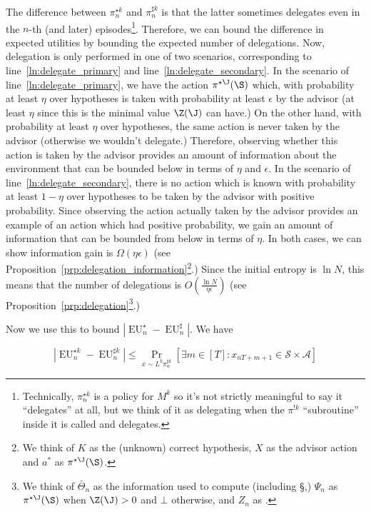 \documentclass[anon,12pt]{colt2018} %
\newcommand{\AP}[1]{\left(#1\right)}
\newcommand{\AB}[1]{\left[#1\right]}
\newcommand{\Pa}[2]{\underset{#1}{\operatorname{Pr}}\AB{#2}}
\newcommand{\Abs}[1]{\left\vert #1 \right\vert}
\newcommand{\A}{\mathcal{A}}
\newcommand{\St}{\mathcal{S}}
\newcommand{\EU}{\operatorname{EU}}
\begin{document}
The difference between $\pi^{\star k}_n$ and $\pi^{\sharp k}_n$ is that the latter sometimes delegates even in the $n$-th (and later) episodes\footnote{Technically, $\pi^{\star k}_n$ is a policy for $M^k$ so it's not strictly meaningful to say it \enquote{delegates} at all, but we think of it as delegating when the $\pi^{!k}$ \enquote{subroutine} inside it is called and delegates.}. Therefore, we can bound the difference in expected utilities by bounding the expected number of delegations. Now, delegation is only performed in one of two scenarios, corresponding to line~\ref{ln:delegate_primary} and line~\ref{ln:delegate_secondary}. In the scenario of line~\ref{ln:delegate_primary}, we have the action $\pi^{\star\J}(\S)$ which, with probability at least $\eta$ over hypotheses is taken with probability at least $\epsilon$ by the advisor (at least $\eta$ since this is the minimal value $\Z(\J)$ can have.) On the other hand, with probability at least $\eta$ over hypotheses, the same action is never taken by the advisor (otherwise we wouldn't delegate.) Therefore, observing whether this action is taken by the advisor provides an amount of information about the environment that can be bounded below in terms of $\eta$ and $\epsilon$. In the scenario of line~\ref{ln:delegate_secondary}, there is no action which is known with probability at least $1-\eta$ over hypotheses to be taken by the advisor with positive probability. Since observing the action actually taken by the advisor provides an example of an action which had positive probability, we gain an amount of information that can be bounded from below in terms of $\eta$. In both cases, we can show information gain is $\Omega(\eta\epsilon)$ (see Proposition~\ref{prp:delegation_information}\footnote{We think of $K$ as the (unknown) correct hypothesis, $X$ as the advisor action and $a^*$ as $\pi^{\star\J}(\S)$.}.) Since the initial entropy is $\ln{N}$, this means that the number of delegations is $O\AP{\frac{\ln{N}}{\eta\epsilon}}$ (see Proposition~\ref{prp:delegation}\footnote{We think of $\bar{\Theta}_n$ as the information used to compute \Z (including \S,) $\Psi_n$ as $\pi^{\star\J}(\S)$ when $\Z(\J)>0$ and $\bot$ otherwise, and $Z_n$ as \Z.}.)

Now we use this to bound $\Abs{\EU^\star_n-\EU^\sharp_n}$. We have

\begin{equation}
\Abs{\EU^{\star k}_n-\EU^{\sharp k}_n} \leq \Pa{x\sim L^k\pi^{\sharp k}_n}{\exists m \in [T]: x_{nT+m+1}\in\St \times \A}
\end{equation}
\end{document}
